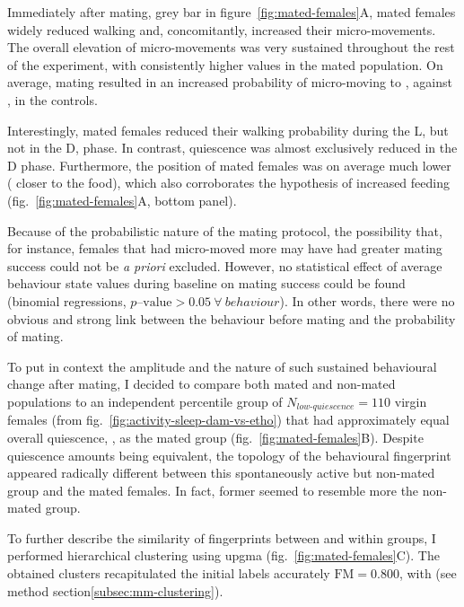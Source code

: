 Immediately after mating, grey bar in figure~\ref{fig:mated-females}A, mated females widely reduced walking and, concomitantly, increased their micro-movements.
The overall elevation of micro-movements was very sustained throughout the rest of the experiment, with consistently higher values in the mated population.
On average, mating resulted in an increased probability of micro-moving to , against , in the controls.

Interestingly, mated females reduced their walking probability during the L, but not in the D,  phase.
In contrast, quiescence was almost exclusively reduced in the D phase.
Furthermore, the position of mated females was on average much lower (\ie{} closer to the food), which also corroborates the hypothesis of increased feeding (fig.~\ref{fig:mated-females}A, bottom panel).


Because of the probabilistic nature of the mating protocol, the possibility that,
for instance, females that had micro-moved more may have had greater mating success could not be \emph{a priori} excluded.
However, no statistical effect of average behaviour state values during baseline on mating success could be found (binomial regressions, $p\text{--value} > 0.05~\forall~behaviour$).
In other words, there were no obvious and strong link between the behaviour before mating and the probability of mating.

To put in context the amplitude and the nature of such sustained behavioural change after mating, I decided to compare both mated and non-mated populations to an independent percentile group of $N_{low\text{-}quiescence} = 110$ virgin females (from fig.~\ref{fig:activity-sleep-dam-vs-etho}) that had approximately equal overall quiescence, , as the mated group  (fig.~\ref{fig:mated-females}B).
Despite quiescence amounts being equivalent, the topology of the behavioural fingerprint appeared radically different between this spontaneously active but non-mated group and the mated females. In fact, former seemed to resemble more the non-mated group.

To further describe the similarity of fingerprints between and within groups, I performed hierarchical clustering using \gls{upgma} (fig.~\ref{fig:mated-females}C). 
The obtained clusters recapitulated the initial labels accurately
$\text{FM} = 0.800$, with 
(see method section\ref{subsec:mm-clustering}).


